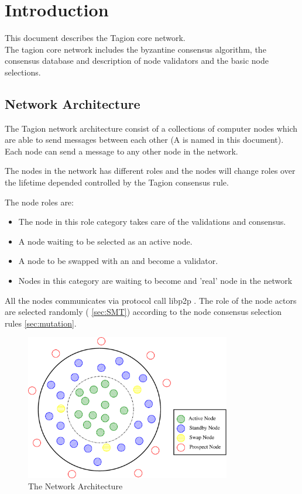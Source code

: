 \section{Introduction}
This document describes the Tagion core network.\\
The tagion core network includes the byzantine consensus algorithm, the consensus database and description of node validators and the basic node selections.
\subsection{Network Architecture}
The Tagion network architecture consist of a collections of computer nodes which are able to send messages between each other (A  is named  in this document). Each node can send a message to any other node in the network.

The nodes in the network has different roles and the nodes will change roles over the lifetime depended controlled by the Tagion consensus rule. 

The node roles are:
\begin{itemize}
	\item[\bfit{Active Node}] The node in this role category takes care of the validations and consensus.
	\item[\bfit{Standby Node}] A node waiting to be selected as an active node.
	\item[\bfit{Swap Node}] A node to be swapped with an  and become a validator.  
	\item[\bfit{Prospect Node}] Nodes in this category are waiting to become and 'real' node in the network 
	\label{tab:node_roles}
\end{itemize}

All the nodes communicates via protocol call libp2p \cite{libp2p}. The role of the node actors are selected randomly ( \cref{sec:SMT}) according to the node consensus selection rules \cref{sec:mutation}.

\begin{figure}[H]
	\centering
	\includegraphics[width=0.8\textwidth]{fig/network_architecture.eps}
	\caption{The Network Architecture}

	\label{fig:network_architecture}
\end{figure}

